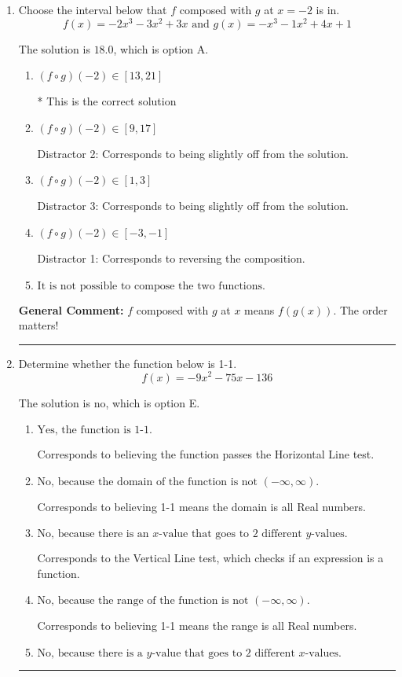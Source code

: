 \documentclass{extbook}[14pt]
\newcommand{\litem}[1]{\item #1

\rule{\textwidth}{0.4pt}}
\begin{document}
\begin{enumerate}\litem{
Choose the interval below that $f$ composed with $g$ at $x=-2$ is in.
\[ f(x) = -2x^{3} -3 x^{2} +3 x \text{ and } g(x) = -x^{3} -1 x^{2} +4 x + 1 \]

The solution is \( 18.0 \), which is option A.\begin{enumerate}[label=\Alph*.]
\item \( (f \circ g)(-2) \in [13, 21] \)

* This is the correct solution
\item \( (f \circ g)(-2) \in [9, 17] \)

 Distractor 2: Corresponds to being slightly off from the solution.
\item \( (f \circ g)(-2) \in [1, 3] \)

 Distractor 3: Corresponds to being slightly off from the solution.
\item \( (f \circ g)(-2) \in [-3, -1] \)

 Distractor 1: Corresponds to reversing the composition.
\item \( \text{It is not possible to compose the two functions.} \)


\end{enumerate}

\textbf{General Comment:} $f$ composed with $g$ at $x$ means $f(g(x))$. The order matters!
}
\litem{
Determine whether the function below is 1-1.
\[ f(x) = -9 x^2 - 75 x - 136 \]

The solution is \( \text{no} \), which is option E.\begin{enumerate}[label=\Alph*.]
\item \( \text{Yes, the function is 1-1.} \)

Corresponds to believing the function passes the Horizontal Line test.
\item \( \text{No, because the domain of the function is not $(-\infty, \infty)$.} \)

Corresponds to believing 1-1 means the domain is all Real numbers.
\item \( \text{No, because there is an $x$-value that goes to 2 different $y$-values.} \)

Corresponds to the Vertical Line test, which checks if an expression is a function.
\item \( \text{No, because the range of the function is not $(-\infty, \infty)$.} \)

Corresponds to believing 1-1 means the range is all Real numbers.
\item \( \text{No, because there is a $y$-value that goes to 2 different $x$-values.} \)


\end{enumerate}}
\end{enumerate}
\end{document}
